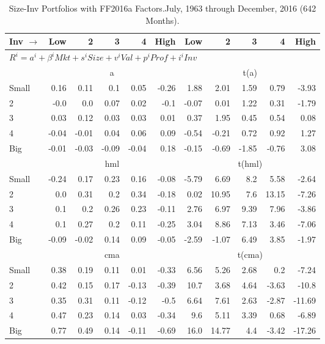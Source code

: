 
\begin{table}[!ht]
\centering
\caption{Size-Inv Portfolios with FF2016a Factors.\footnotesize{July, 1963 through December, 2016 (642 Months).}}
\begin{tabular}{lrrrrrrrrrr}
  \toprule
  Inv $\rightarrow$ & Low & 2 & 3 & 4 & High & Low & 2 & 3 & 4 & High \\ 
  \toprule
  \multicolumn{9}{l}{$R^i=a^i+\beta^iMkt+s^iSize+v^iVal+p^iProf+i^iInv$} \\

      & \multicolumn{5}{c}{a} & \multicolumn{5}{c}{t(a)} \\
    \cmidrule(r){2-6} \cmidrule(r){7-11}
      Small  & 0.16  & 0.11  & 0.1  & 0.05  & -0.26   & 1.88  & 2.01  & 1.59  & 0.79  & -3.93  \\
          2  & -0.0  & 0.0  & 0.07  & 0.02  & -0.1   & -0.07  & 0.01  & 1.22  & 0.31  & -1.79  \\
          3  & 0.03  & 0.12  & 0.03  & 0.03  & 0.01   & 0.37  & 1.95  & 0.45  & 0.54  & 0.08  \\
          4  & -0.04  & -0.01  & 0.04  & 0.06  & 0.09   & -0.54  & -0.21  & 0.72  & 0.92  & 1.27  \\
      Big    & -0.01  & -0.03  & -0.09  & -0.04  & 0.18   & -0.15  & -0.69  & -1.85  & -0.76  & 3.08  \\

      & \multicolumn{5}{c}{hml} & \multicolumn{5}{c}{t(hml)} \\
    \cmidrule(r){2-6} \cmidrule(r){7-11}
      Small  & -0.24  & 0.17  & 0.23  & 0.16  & -0.08   & -5.79  & 6.69  & 8.2  & 5.58  & -2.64  \\
          2  & 0.0  & 0.31  & 0.2  & 0.34  & -0.18   & 0.02  & 10.95  & 7.6  & 13.15  & -7.26  \\
          3  & 0.1  & 0.2  & 0.26  & 0.23  & -0.11   & 2.76  & 6.97  & 9.39  & 7.96  & -3.86  \\
          4  & 0.1  & 0.27  & 0.2  & 0.11  & -0.25   & 3.04  & 8.86  & 7.13  & 3.46  & -7.06  \\
      Big    & -0.09  & -0.02  & 0.14  & 0.09  & -0.05   & -2.59  & -1.07  & 6.49  & 3.85  & -1.97  \\

      & \multicolumn{5}{c}{cma} & \multicolumn{5}{c}{t(cma)} \\
    \cmidrule(r){2-6} \cmidrule(r){7-11}
      Small  & 0.38  & 0.19  & 0.11  & 0.01  & -0.33   & 6.56  & 5.26  & 2.68  & 0.2  & -7.24  \\
          2  & 0.42  & 0.15  & 0.17  & -0.13  & -0.39   & 10.7  & 3.68  & 4.64  & -3.63  & -10.8  \\
          3  & 0.35  & 0.31  & 0.11  & -0.12  & -0.5   & 6.64  & 7.61  & 2.63  & -2.87  & -11.69  \\
          4  & 0.47  & 0.23  & 0.14  & 0.03  & -0.34   & 9.6  & 5.11  & 3.39  & 0.68  & -6.89  \\
      Big    & 0.77  & 0.49  & 0.14  & -0.11  & -0.69   & 16.0  & 14.77  & 4.4  & -3.42  & -17.26  \\

  

  \bottomrule
\end{tabular}
\label{tbl:25_Size_Inv_FF2016a}
\end{table}